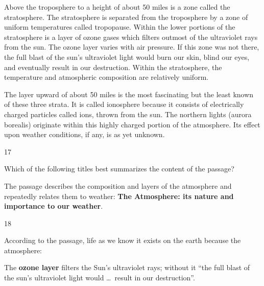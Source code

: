 \begin{context}
Above the troposphere to a height of about 50 miles is a zone called the stratosphere. The stratosphere is separated from the troposphere by a zone of uniform temperatures called tropopause. Within the lower portions of the stratosphere is a layer of ozone gases which filters outmost of the ultraviolet rays from the sun. The ozone layer varies with air pressure. If this zone was not there, the full blast of the sun's ultraviolet light would burn our skin, blind our eyes, and eventually result in our destruction. Within the stratosphere, the temperature and atmospheric composition are relatively uniform.

The layer upward of about 50 miles is the most fascinating but the least known of these three strata. It is called ionosphere because it consists of electrically charged particles called ions, thrown from the sun. The northern lights (aurora borealis) originate within this highly charged portion of the atmosphere. Its effect upon weather conditions, if any, is as yet unknown.
\end{context}
\begin{question}{17}
{Which of the following titles best summarizes the content of the passage?\par}
\begin{explain}
The passage describes the composition and layers of the atmosphere and repeatedly relates them to weather: \textbf{The Atmosphere: its nature and importance to our weather}.
\end{explain}
\end{question}

\begin{question}{18}
{According to the passage, life as we know it exists on the earth because the atmosphere:\par}
\begin{explain}
The \textbf{ozone layer} filters the Sun's ultraviolet rays; without it ``the full blast of the sun's ultraviolet light would \ldots\ result in our destruction''.
\end{explain}
\end{question}

